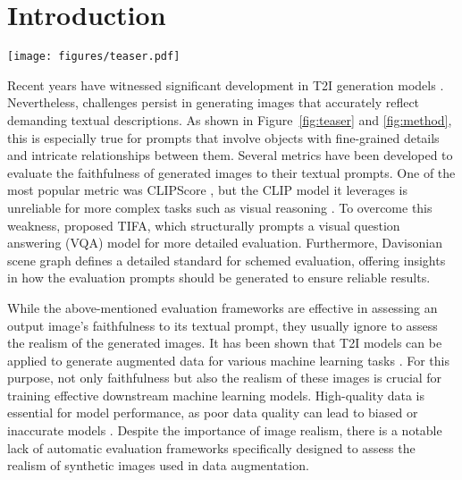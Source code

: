 \section{Introduction}
\begin{figure*}[ht!]
    \centering
    \texttt{[image: figures/teaser.pdf]}
    \caption{Overview of the three dimensions of realism we study. On the left, a image generated by Stable Diffusion v3.5 exhibits incorrect visual attributes for the species, resembling a cat despite having the distinctive tail. In the middle, Kandinsky 3 struggles with the unusual visual relationships, generating a person that's overlapping with the bed instead of carrying it. On the right, DALL-E 3 produces a stylized illustration instead of a photorealistic image as prompted. \name score correctly identifies all real images, whereas CLIPScore does not.}
    \label{fig:teaser}
\end{figure*}

Recent years have witnessed significant development in T2I generation models \cite{reed2016generative, xu2018attngan, sd1, dalle3, kandinsky3, sd3}. Nevertheless, challenges persist in generating images that accurately reflect demanding textual descriptions.
As shown in Figure~\ref{fig:teaser} and \ref{fig:method}, this is especially true for prompts that involve objects with fine-grained details and intricate relationships between them. Several metrics have been developed to evaluate the faithfulness of generated images to their textual prompts. One of the most popular metric was CLIPScore \cite{hessel2021clipscore}, but the CLIP model it leverages is unreliable for more complex tasks such as visual reasoning \cite{clip}. To overcome this weakness, \citet{hu2023tifa} proposed TIFA, which structurally prompts a visual question answering (VQA) model for more detailed evaluation. Furthermore, Davisonian scene graph \cite{chodavidsonian} defines a detailed standard for schemed evaluation, offering insights in how the evaluation prompts should be generated to ensure reliable results.

While the above-mentioned evaluation frameworks are effective in assessing an output image's faithfulness to its textual prompt, they usually ignore to assess the realism of the generated images. It has been shown that T2I models can be applied to generate augmented data for various machine learning tasks \cite{shivashankar2023semantic, jin2024schema, jin2024armada}. For this purpose, not only faithfulness but also the realism of these images is crucial for training effective downstream machine learning models. High-quality data is essential for model performance, as poor data quality can lead to biased or inaccurate models \cite{polyzotis2019data, jain2020overview}. Despite the importance of image realism, there is a notable lack of automatic evaluation frameworks specifically designed to assess the realism of synthetic images used in data augmentation.

